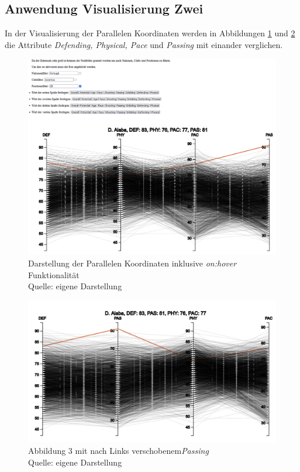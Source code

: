\documentclass[usegeometry=true]{scrartcl}
\begin{document}
\subsection{Anwendung Visualisierung Zwei}
In der Visualisierung der Parallelen Koordinaten werden in Abbildungen \ref{PK5} und \ref{PK51} die Attribute \textit{Defending, Physical, Pace} und \textit{Passing} mit einander verglichen.

\begin{figure}[h!]
\centering
\includegraphics[scale=0.6]{grafiken/ParalleleKoordinaten5}
\caption{Darstellung der Parallelen Koordinaten inklusive \textit{on:hover} Funktionalität\\ Quelle: eigene Darstellung}
\label{PK5}
\end{figure}

\begin{figure}[h!]
\centering
\includegraphics[scale=0.4]{grafiken/ParalleleKoordinaten51}
\caption{Abbildung 3 mit nach Links verschobenem\textit{Passing}\\ Quelle: eigene Darstellung}
\label{PK51}
\end{figure}
\end{document}
